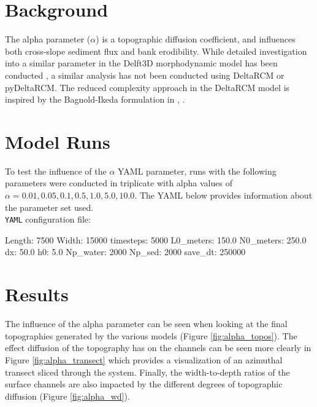 \section{Background}
The alpha parameter ($\alpha$) is a topographic diffusion coefficient, and influences both cross-slope sediment flux and bank erodibility.
While detailed investigation into a similar parameter in the Delft3D morphodynamic model has been conducted \citep{Baar2019}, a similar analysis has not been conducted using DeltaRCM or pyDeltaRCM.
The reduced complexity approach in the DeltaRCM model is inspired by the Bagnold-Ikeda formulation in \citet{Garcia2008}, \citep{Liang2015a}.

\section{Model Runs}
To test the influence of the $\alpha$ YAML parameter, runs with the following parameters were conducted in triplicate with alpha values of $\alpha = 0.01, 0.05, 0.1, 0.5, 1.0, 5.0, 10.0$.
The YAML below provides information about the parameter set used.\\

\noindent \texttt{YAML} configuration file: \vspace{-6pt}
\begin{boxedverbatim}
Length: 7500
Width: 15000
timesteps: 5000
L0_meters: 150.0
N0_meters: 250.0
dx: 50.0
h0: 5.0
Np_water: 2000
Np_sed: 2000
save_dt: 250000
\end{boxedverbatim}

\section{Results}
The influence of the alpha parameter can be seen when looking at the final topographies generated by the various models (Figure \ref{fig:alpha_topos}).
The effect diffusion of the topography has on the channels can be seen more clearly in Figure \ref{fig:alpha_transect} which provides a visualization of an azimuthal transect sliced through the system.
Finally, the width-to-depth ratios of the surface channels are also impacted by the different degrees of topographic diffusion (Figure \ref{fig:alpha_wd}).


